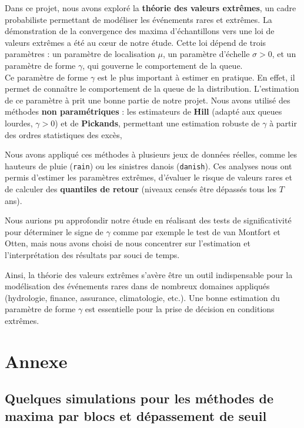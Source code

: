 \documentclass{article}
\theoremstyle{plain}
\theoremstyle{definition}
\theoremstyle{plain}
\begin{document}
Dans ce projet, nous avons exploré la \textbf{théorie des valeurs extrêmes}, un cadre probabiliste permettant de modéliser les événements rares et extrêmes. 
La démonstration de la convergence des maxima d’échantillons vers une loi de valeurs extrêmes a été au cœur de notre étude. Cette loi dépend de trois paramètres : un paramètre de localisation $\mu$, un paramètre d’échelle $\sigma > 0$, et un paramètre de forme $\gamma$, qui gouverne le comportement de la queue.
\\
Ce paramètre de forme $\gamma$ est le plus important à estimer en pratique. En effet, il permet de connaître le comportement de la queue de la distribution.
L'estimation de ce paramètre à prit une bonne partie de notre projet. Nous avons utilisé
des méthodes \textbf{non paramétriques} : les estimateurs de \textbf{Hill} (adapté aux queues lourdes, $\gamma > 0$) et de \textbf{Pickands}, permettant une estimation robuste de $\gamma$ à partir des ordres statistiques des excès,



\medskip

Nous avons appliqué ces méthodes à plusieurs jeux de données réelles, comme les hauteurs de pluie (\texttt{rain}) ou les sinistres danois (\texttt{danish}). Ces analyses nous ont permis d'estimer les paramètres extrêmes, d'évaluer le risque de valeurs rares et de calculer des \textbf{quantiles de retour} (niveaux censés être dépassés tous les $T$ ans).

\medskip

Nous aurions pu approfondir notre étude en réalisant des tests de significativité pour déterminer le signe de $\gamma$ comme par exemple le test de van Montfort et Otten, mais nous avons choisi de nous concentrer sur l'estimation et l'interprétation des résultats par souci de temps.

\medskip

Ainsi, la théorie des valeurs extrêmes s’avère être un outil indispensable pour la modélisation des événements rares dans de nombreux domaines appliqués (hydrologie, finance, assurance, climatologie, etc.). Une bonne estimation du paramètre de forme $\gamma$ est essentielle pour la prise de décision en conditions extrêmes.


\newpage
\section{Annexe}
\subsection{Quelques simulations pour les méthodes de maxima par blocs et dépassement de seuil}
\end{document}
